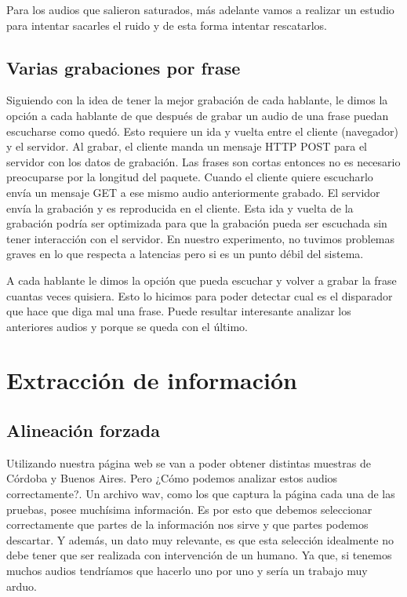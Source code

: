 \documentclass[11pt,a4paper,twoside]{tesis}
\begin{document}
Para los audios que salieron saturados, más adelante vamos a realizar un estudio para intentar sacarles el ruido y de esta forma intentar rescatarlos.

\section{Varias grabaciones por frase}

Siguiendo con la idea de tener la mejor grabación de cada hablante, le dimos la opción a cada hablante de que después de grabar un audio de una frase puedan escucharse como quedó. Esto requiere un ida y vuelta entre el cliente (navegador) y el servidor. Al grabar, el cliente manda un mensaje HTTP POST para el servidor con los datos de grabación. Las frases son cortas entonces no es necesario preocuparse por la longitud del paquete. Cuando el cliente quiere escucharlo envía un mensaje GET a ese mismo audio anteriormente grabado. El servidor envía la grabación y es reproducida en el cliente. Esta ida y vuelta de la grabación podría ser optimizada para que la grabación pueda ser escuchada sin tener interacción con el servidor. En nuestro experimento, no tuvimos problemas graves en lo que respecta a latencias pero si es un punto débil del sistema.

A cada hablante le dimos la opción que pueda escuchar y volver a grabar la frase cuantas veces quisiera. Esto lo hicimos para poder detectar cual es el disparador que hace que diga mal una frase. Puede resultar interesante analizar los anteriores audios y porque se queda con el último.

\chapter{Extracción de información}

\section{Alineación forzada}

Utilizando nuestra página web se van a poder obtener distintas muestras de Córdoba y Buenos Aires. Pero ¿Cómo podemos analizar estos audios correctamente?. Un archivo wav, como los que captura la página cada una de las pruebas, posee muchísima información. Es por esto que debemos seleccionar correctamente que partes de la información nos sirve y que partes podemos descartar. Y además, un dato muy relevante, es que esta selección idealmente no debe tener que ser realizada con intervención de un humano. Ya que, si tenemos muchos audios tendríamos que hacerlo uno por uno y sería un trabajo muy arduo.
\end{document}
